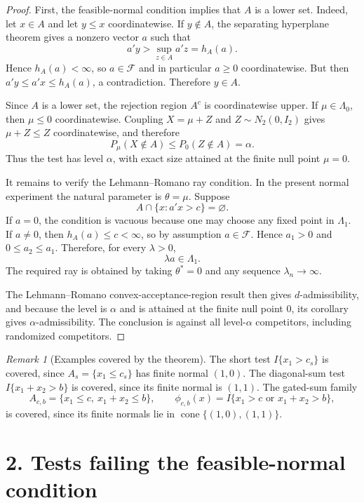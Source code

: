 \documentclass[12pt]{article}
\theoremstyle{remark}
\newtheorem{remark}{Remark}
\begin{document}
\begin{proof}
First, the feasible-normal condition implies that $A$ is a lower set. Indeed, let $x\in A$ and let $y\le x$ coordinatewise. If $y\notin A$, the separating hyperplane theorem gives a nonzero vector $a$ such that
\[
a'y>\sup_{z\in A}a'z=h_A(a).
\]
Hence $h_A(a)<\infty$, so $a\in\mathcal F$ and in particular $a\ge0$ coordinatewise. But then $a'y\le a'x\le h_A(a)$, a contradiction. Therefore $y\in A$.

Since $A$ is a lower set, the rejection region $A^c$ is coordinatewise upper. If $\mu\in\Lambda_0$, then $\mu\le0$ coordinatewise. Coupling $X=\mu+Z$ and $Z\sim N_2(0,I_2)$ gives $\mu+Z\le Z$ coordinatewise, and therefore
\[
P_\mu(X\notin A)\le P_0(Z\notin A)=\alpha.
\]
Thus the test has level $\alpha$, with exact size attained at the finite null point $\mu=0$.

It remains to verify the Lehmann--Romano ray condition. In the present normal experiment the natural parameter is $\theta=\mu$. Suppose
\[
A\cap\{x:a'x>c\}=\varnothing.
\]
If $a=0$, the condition is vacuous because one may choose any fixed point in $\Lambda_1$. If $a\ne0$, then $h_A(a)\le c<\infty$, so by assumption $a\in\mathcal F$. Hence $a_1>0$ and $0\le a_2\le a_1$. Therefore, for every $\lambda>0$,
\[
\lambda a\in\Lambda_1.
\]
The required ray is obtained by taking $\theta^*=0$ and any sequence $\lambda_n\to\infty$.

The Lehmann--Romano convex-acceptance-region result then gives $d$-admissibility, and because the level is $\alpha$ and is attained at the finite null point $0$, its corollary gives $\alpha$-admissibility. The conclusion is against all level-$\alpha$ competitors, including randomized competitors.
\end{proof}

\begin{remark}[Examples covered by the theorem]
The short test $I\{x_1>c_s\}$ is covered, since $A_s=\{x_1\le c_s\}$ has finite normal $(1,0)$. The diagonal-sum test $I\{x_1+x_2>b\}$ is covered, since its finite normal is $(1,1)$. The gated-sum family
\[
A_{c,b}=\{x_1\le c,\ x_1+x_2\le b\},
\qquad
\phi_{c,b}(x)=I\{x_1>c\text{ or }x_1+x_2>b\},
\]
is covered, since its finite normals lie in $\operatorname{cone}\{(1,0),(1,1)\}$.
\end{remark}

\section*{2. Tests failing the feasible-normal condition}
\end{document}

